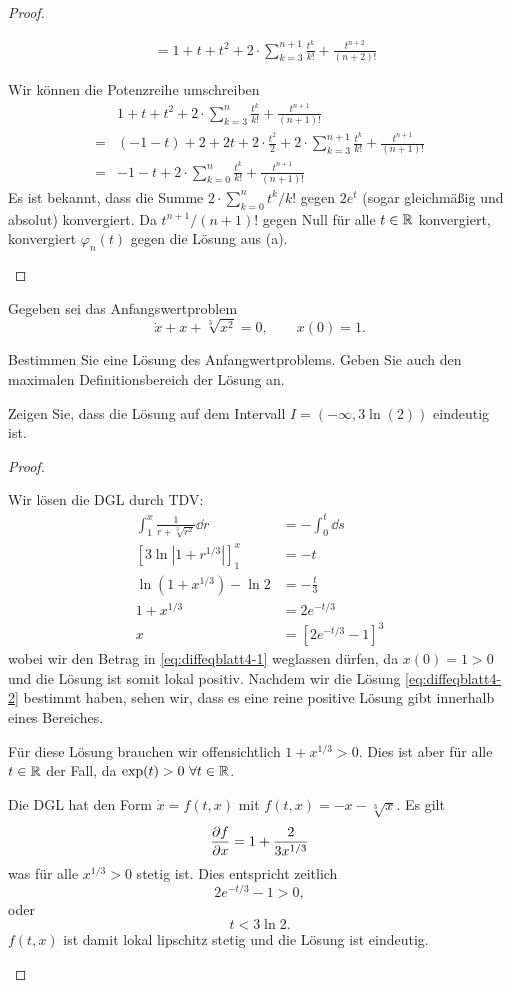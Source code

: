 \begin{proof}
\begin{parts}
\begin{align*}
			&=1+t+t^2 + 2\cdot \sum_{k=3}^{n+1}\frac{t^k}{k!}+\frac{t^{n+2}}{(n+2)!}
\end{align*}
\item Wir können die Potenzreihe umschreiben
	\begin{align*}
			&1+t+t^2 + 2\cdot \sum_{k=3}^{n}\frac{t^k}{k!}+\frac{t^{n+1}}{(n+1)!}\\
		=&(-1-t)+2+2t+2\cdot \frac{t^2}{2}+2\cdot \sum_{k=3}^{n+1}\frac{t^k}{k!}+\frac{t^{n+1}}{(n+1)!}\\
		=&-1-t+2\cdot \sum_{k=0}^n \frac{t^k}{k!}+\frac{t^{n+1}}{(n+1)!}
	\end{align*}
	Es ist bekannt, dass die Summe $2\cdot \sum_{k=0}^{n} t^k / k!$ gegen $2e^t$ (sogar gleichmäßig und absolut) konvergiert. Da $t^{n+1} / (n+1)!$ gegen Null f\"{u}r alle $t\in \mathbb{R}$ konvergiert, konvergiert $\varphi_n(t)$ gegen die L\"{o}sung aus (a).\qedhere
	\end{parts}
\end{proof}
\begin{Problem}
	Gegeben sei das Anfangswertproblem
	\[
		\dot{x}+x+\sqrt[3]{x^2} =0,\qquad x(0)=1
	.\] 
	\begin{parts}
	\item Bestimmen Sie eine L\"{o}sung des Anfangwertproblems. Geben Sie auch den maximalen Definitionsbereich der L\"{o}sung an.
	\item Zeigen Sie, dass die L\"{o}sung auf dem Intervall $I=(-\infty, 3\ln (2))$ eindeutig ist.
	\end{parts}
\end{Problem}
\begin{proof}
	\begin{parts}
	\item Wir l\"{o}sen die DGL durch TDV:
		\begin{align*}
			\int_1^x \frac{1}{r+\sqrt[3]{r^2} }\dd{r}&=-\int_0^t \dd{s}\\
			[3\ln|1+r^{1/3}|]_1^x &= -t\tag{*}\label{eq:diffeqblatt4-1}\\
			\ln (1+x^{1/3})-\ln 2 &=-\frac t3\\
			1+x^{1/3}&=2 e^{-t/3}\\
			x&=\left[ 2e^{-t / 3}-1 \right]^3\tag{!}\label{eq:diffeqblatt4-2}
		\end{align*}
		wobei wir den Betrag in \eqref{eq:diffeqblatt4-1} weglassen dürfen, da $x(0)=1>0$ und die Lösung ist somit lokal positiv. Nachdem wir die Lösung \eqref{eq:diffeqblatt4-2} bestimmt haben, sehen wir, dass es eine reine positive Lösung gibt innerhalb eines Bereiches.
		
		Für diese Lösung brauchen wir offensichtlich $1+x^{1/3}>0$. Dies ist aber für alle $t\in \mathbb{R}$ der Fall, da $\exp(t)>0~\forall t\in \mathbb{R}$.
		\item Die DGL hat den Form $\dot{x}=f(t,x)$ mit $f(t,x)=-x-\sqrt[3]{x}$. Es gilt
		\[\pdv{f}{x}=1+\frac{2}{3x^{1/3}}\]
		was für alle $x^{1/3}>0$ stetig ist. Dies entspricht zeitlich
		\[
		2e^{-t / 3}-1>0
		,\]
		oder
		\[
		t<3\ln 2
		.\]
		$f(t, x)$ ist damit lokal lipschitz stetig und die Lösung ist eindeutig.\qedhere
	\end{parts}
\end{proof}
